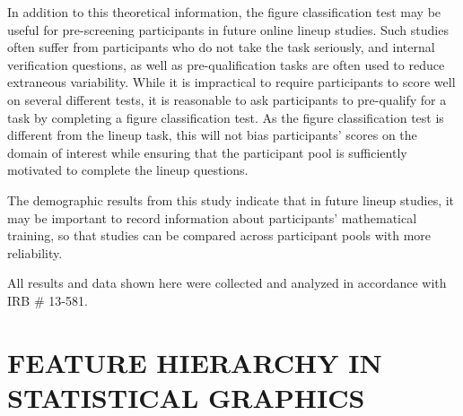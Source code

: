 \documentclass[11pt]{isuthesis}\usepackage[]{graphicx}\usepackage[]{color}
\newcommand\chaptocbreak{
	\addtocontents{toc}{\protect\needspace{4\baselineskip}}
	\addtocontents{lof}{\protect\needspace{2\baselineskip}}
	\addtocontents{lot}{\protect\needspace{2\baselineskip}}
}
\begin{document}
In addition to this theoretical information, the figure classification test may be useful for pre-screening participants in future online lineup studies.
Such studies often suffer from participants who do not take the task seriously, and internal verification questions, as well as pre-qualification tasks are often used to reduce extraneous variability.
While it is impractical to require participants to score well on several different tests, it is reasonable to ask participants to pre-qualify for a task by completing a figure classification test.
As the figure classification test is different from the lineup task, this will not bias participants' scores on the domain of interest while ensuring that the participant pool is sufficiently motivated to complete the lineup questions.

The demographic results from this study indicate that in future lineup studies, it may be important to record information about participants' mathematical training, so that studies can be compared across participant pools with more reliability. 

All results and data shown here were collected and analyzed in accordance with IRB \# 13-581.
\chaptocbreak

\chapter{FEATURE HIERARCHY IN STATISTICAL GRAPHICS}\label{featurehierarchy}


\graphicspath{{Figure/FeatureHierarchy/}{Images/FeatureHierarchy/}}
\renewcommand{\floatpagefraction}{.99}


\end{document}
